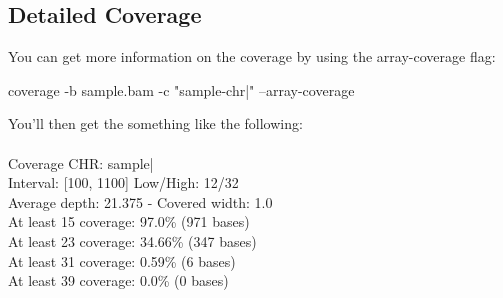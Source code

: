 \subsection{Detailed Coverage}
You can get more information on the coverage by using the array-coverage flag:\\
\begin{markdown}
coverage -b sample.bam -c "sample-chr|"  --array-coverage
\end{markdown}

You'll then get the something like the following:\\
\\
Coverage CHR: sample|\\
Interval: [100, 1100]  Low/High: 12/32\\
Average depth: 21.375 - Covered width: 1.0\\
At least 15 coverage: 97.0\% (971 bases)\\
At least 23 coverage: 34.66\% (347 bases)\\
At least 31 coverage: 0.59\% (6 bases)\\
At least 39 coverage: 0.0\% (0 bases)\\